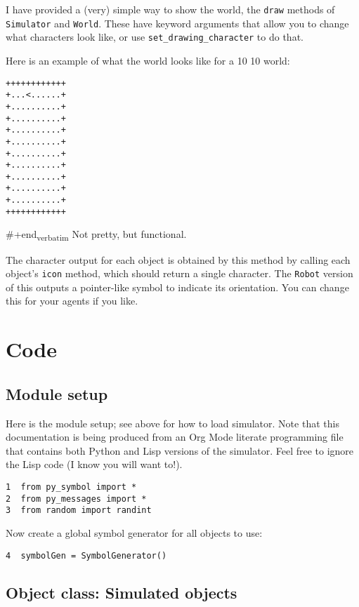 \documentclass[11pt]{tufte-handout}
\begin{document}
I have provided a (very) simple way to show the world, the \texttt{draw} methods of \texttt{Simulator} and \texttt{World}. These have keyword arguments that allow you to change what characters look like, or use \texttt{set\_drawing\_character} to do that.

Here is an example of what the world looks like for a 10 \texttimes{} 10 world:
\begin{verbatim}
++++++++++++
+...<......+
+..........+
+..........+
+..........+
+..........+
+..........+
+..........+
+..........+
+..........+
+..........+
++++++++++++
\end{verbatim}

\#+end\textsubscript{verbatim}
\noident Not pretty, but functional.

The character output for each object is obtained by this method by calling each object's \texttt{icon} method, which should return a single character.  The \texttt{Robot} version of this outputs a pointer-like symbol to indicate its orientation.  You can change this for your agents if you like.

\section{Code}
\label{sec:orgadacc17}
\label{org14773b1}

\subsection{Module setup}
\label{sec:org0d83504}

Here is the module setup; see above for how to load simulator.  Note that this documentation is being produced from an Org Mode literate programming file that contains both Python and Lisp versions of the simulator.  Feel free to ignore the Lisp code (I know you will want to!).

\begin{verbatim}
1  from py_symbol import *
2  from py_messages import *
3  from random import randint
\end{verbatim}

Now create a global symbol generator for all objects to use:
\begin{verbatim}
4  symbolGen = SymbolGenerator()
\end{verbatim}

\subsection{Object class: Simulated objects}
\label{sec:orgd286dce}
\end{document}
